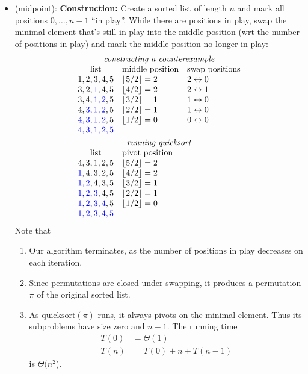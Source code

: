 \documentclass[a4paper]{article}
\newcommand*{\floor}[1]{\left\lfloor{#1}\right\rfloor}
\begin{document}
\begin{itemize}
	\item
	(midpoint):
	\textbf{Construction:}
	Create a sorted list of length $n$ and mark all positions $0,\ldots,n-1$ ``in play''.
	While there are positions in play, swap the minimal element that's still in play into the middle position (wrt the number of positions in play) and mark the middle position no longer in play:
	\[
		\begin{array}{cll}
		\multicolumn{3}{c}{\text{\emph{constructing a counterexample}}} \\
		\text{list} & \text{middle position} & \text{swap positions} \\
		1, 2, 3, 4, 5	&\floor{5/2} = 2 & 2 \SWAP 0\\
		3, 2, \USED{1}, 4, 5	&\floor{4/2} = 2 & 2 \SWAP 1 \\
		3, 4, \USED{1, 2}, 5	&\floor{3/2} = 1 & 1 \SWAP 0 \\
		4, \USED{3, 1, 2}, 5	&\floor{2/2} = 1 & 1 \SWAP 0 \\
		\USED{4, 3, 1, 2}, 5	&\floor{1/2} = 0 & 0 \SWAP 0 \\
		\USED{4, 3, 1, 2, 5} \\[\jot]
		\multicolumn{3}{c}{\text{\emph{running quicksort}}} \\
		\text{list} & \text{pivot position} \\
		4, 3, 1, 2, 5	& \floor{5/2} = 2 \\
		\USED{1}, 4, 3, 2, 5	&\floor{4/2} = 2 \\
		\USED{1, 2}, 4, 3, 5	&\floor{3/2} = 1 \\
		\USED{1, 2, 3}, 4, 5	&\floor{2/2} = 1 \\
		\USED{1, 2, 3, 4}, 5	&\floor{1/2} = 0 \\
		\USED{1, 2, 3, 4, 5}
		\end{array}
	\]
	Note that
	\begin{enumerate}
	\item Our algorithm terminates, as the number of positions in play decreases on each iteration.
	\item Since permutations are closed under swapping, it produces a permutation $\pi$ of the original sorted list.
	\item As $\text{quicksort}(\pi)$ runs, it always pivots on the minimal element.
	Thus its subproblems have size zero and $n-1$.
	The running time
	\begin{align*}
		T(0) &= \Theta(1) \\
		T(n) &= T(0) + n + T(n-1)
	\end{align*}
	is $\Theta(n^2$).


\end{enumerate}
\end{itemize}
\end{document}
